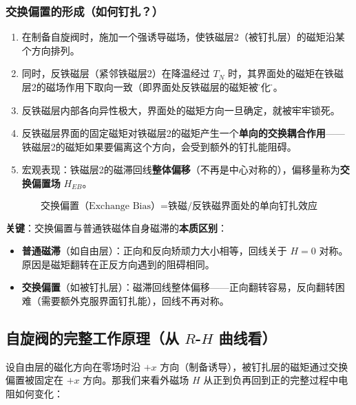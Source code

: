 \documentclass[12pt,a4paper]{article}
\begin{document}
\subsubsection{交换偏置的形成（如何钉扎？）}
\begin{enumerate}
    \item 在制备自旋阀时，施加一个强诱导磁场，使铁磁层2（被钉扎层）的磁矩沿某个方向排列。
    \item 同时，反铁磁层（紧邻铁磁层2）在降温经过 $T_N$ 时，其界面处的磁矩在铁磁层2的磁场作用下取向一致（即界面处反铁磁层的磁矩被\"极化\"）。
    \item 反铁磁层内部各向异性极大，界面处的磁矩方向一旦确定，就被牢牢锁死。
    \item 反铁磁层界面的固定磁矩对铁磁层2的磁矩产生一个\textbf{单向的交换耦合作用}——铁磁层2的磁矩如果要偏离这个方向，会受到额外的钉扎能阻碍。
    \item 宏观表现：铁磁层2的磁滞回线\textbf{整体偏移}（不再是中心对称的），偏移量称为\textbf{交换偏置场} $H_{EB}$。
\end{enumerate}

\begin{equation}
    \boxed{\text{交换偏置（Exchange Bias）}= \text{铁磁/反铁磁界面处的单向钉扎效应}}
\end{equation}

\textbf{关键}：交换偏置与普通铁磁体自身磁滞的\textbf{本质区别}：
\begin{itemize}
    \item \textbf{普通磁滞}（如自由层）：正向和反向矫顽力大小相等，回线关于 $H=0$ 对称。原因是磁矩翻转在正反方向遇到的阻碍相同。
    \item \textbf{交换偏置}（如被钉扎层）：磁滞回线整体偏移——正向翻转容易，反向翻转困难（需要额外克服界面钉扎能），回线不再对称。
\end{itemize}

\subsection{自旋阀的完整工作原理（从 $R$-$H$ 曲线看）}

设自由层的磁化方向在零场时沿 $+x$ 方向（制备诱导），被钉扎层的磁矩通过交换偏置被固定在 $+x$ 方向。那我们来看外磁场 $H$ 从正到负再回到正的完整过程中电阻如何变化：

\begin{center}
\end{center}
\end{document}
